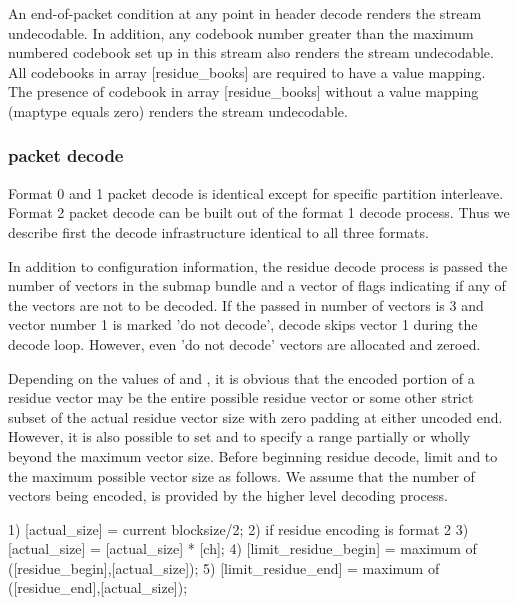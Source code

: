 An end-of-packet condition at any point in header decode renders the
stream undecodable.  In addition, any codebook number greater than the
maximum numbered codebook set up in this stream also renders the
stream undecodable. All codebooks in array [residue_books] are
required to have a value mapping.  The presence of codebook in array
[residue_books] without a value mapping (maptype equals zero) renders
the stream undecodable.



\subsubsection{packet decode}

Format 0 and 1 packet decode is identical except for specific
partition interleave.  Format 2 packet decode can be built out of the
format 1 decode process.  Thus we describe first the decode
infrastructure identical to all three formats.

In addition to configuration information, the residue decode process
is passed the number of vectors in the submap bundle and a vector of
flags indicating if any of the vectors are not to be decoded.  If the
passed in number of vectors is 3 and vector number 1 is marked 'do not
decode', decode skips vector 1 during the decode loop.  However, even
'do not decode' vectors are allocated and zeroed.

Depending on the values of  and
, it is obvious that the encoded
portion of a residue vector may be the entire possible residue vector
or some other strict subset of the actual residue vector size with
zero padding at either uncoded end.  However, it is also possible to
set  and
 to specify a range partially or
wholly beyond the maximum vector size.  Before beginning residue
decode, limit  and
 to the maximum possible vector size
as follows.  We assume that the number of vectors being encoded,
\varname{[ch]} is provided by the higher level decoding
process.

\begin{programlisting}
  1) [actual_size] = current blocksize/2;
  2) if residue encoding is format 2
       3) [actual_size] = [actual_size] * [ch];
  4) [limit_residue_begin] = maximum of ([residue_begin],[actual_size]);
  5) [limit_residue_end] = maximum of ([residue_end],[actual_size]);
\end{programlisting}

